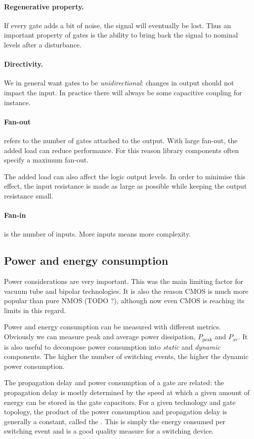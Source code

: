 \documentclass{report}
\begin{document}
\paragraph{Regenerative property.} If every gate adds a bit of noise, the signal will eventually be lost. Thus an important property of gates is the ability to bring back the signal to nominal levels after a disturbance.
\paragraph{Directivity.} We in general want gates to be \textit{unidirectional}: changes in output should not impact the input. In practice there will always be some capacitive coupling for instance.
\paragraph{Fan-out} refers to the number of gates attached to the output. With large fan-out, the added load can reduce performance. For this reason library components often specify a maximum fan-out.

The added load can also affect the logic output levels. In order to minimise this effect, the input resistance is made as large as possible while keeping the output resistance small.

\paragraph{Fan-in} is the number of inputs. More inputs means more complexity.

\subsection{Power and energy consumption}
Power considerations are very important. This was the main limiting factor for vacuum tube and bipolar technologies. It is also the reason CMOS is much more popular than pure NMOS (TODO ?), although now even CMOS is reaching its limits in this regard.

Power and energy consumption can be measured with different metrics. Obviously we can measure peak and average power dissipation, $P_\text{peak}$ and $P_\text{av}$. It is also useful to decompose power consumption into \textit{static} and \textit{dynamic} components. The higher the number of switching events, the higher the dynamic power consumption.

The propagation delay and power consumption of a gate are related: the propagation delay is mostly determined by the speed at which a given amount of energy can be stored in the gate capacitors. For a given technology and gate topology, the product of the power consumption and propagation delay is generally a constant, called the . This is simply the energy consumed per switching event and is a good quality measure for a switching device.
\end{document}
